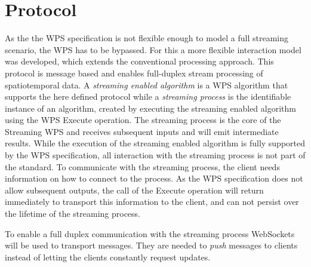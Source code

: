 \section{Protocol}
	As the the \ac{WPS} specification is not flexible enough to model a full streaming scenario, the \ac{WPS} has to be bypassed. For this a more flexible interaction model was developed, which extends the conventional processing approach. This protocol is message based and enables full-duplex stream processing of spatiotemporal data. A \emph{streaming enabled algorithm} is a \ac{WPS} algorithm that supports the here defined protocol while a \emph{streaming process} is the identifiable instance of an algorithm, created by executing the streaming enabled algorithm using the \ac{WPS} Execute operation. The streaming process is the core of the Streaming \ac{WPS} and receives subsequent inputs and will emit intermediate results. While the execution of the streaming enabled algorithm is fully supported by the \ac{WPS} specification, all interaction with the streaming process is not part of the standard. To communicate with the streaming process, the client needs information on how to connect to the process. As the \ac{WPS} specification does not allow subsequent outputs, the call of the Execute operation will return immediately to transport this information to the client, and can not persist over the lifetime of the streaming process.

	To enable a full duplex communication with the streaming process WebSockets will be used to transport messages. They are needed to \emph{push} messages to clients instead of letting the clients constantly request updates.

